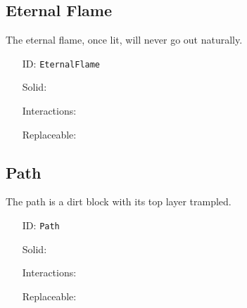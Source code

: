 \subsection{Eternal Flame}\label{subsec:blocks_eternal flame}
The eternal flame, once lit, will never go out naturally.
\newline
\begin{itemize}[nosep]
    \item[ID:] \texttt{EternalFlame}
    \item[Solid:]  \Checkmark \item[Interactions:]  \XSolidBrush \item[Replaceable:]  \XSolidBrush
\end{itemize}

\subsection{Path}\label{subsec:blocks_path}
The path is a dirt block with its top layer trampled.
\newline
\begin{itemize}[nosep]
    \item[ID:] \texttt{Path}
    \item[Solid:]  \Checkmark \item[Interactions:]  \XSolidBrush \item[Replaceable:]  \XSolidBrush
\end{itemize}
